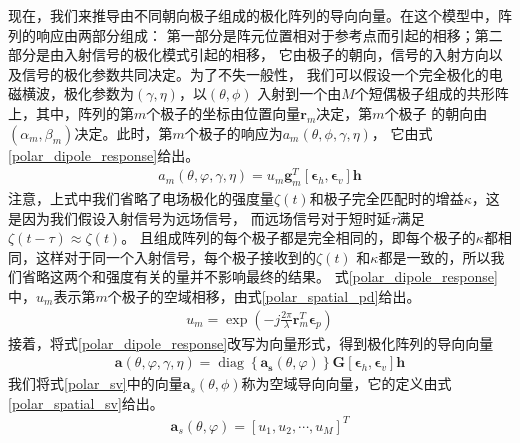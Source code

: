 \documentclass[master]{thesis-uestc}
\begin{document}
现在，我们来推导由不同朝向极子组成的极化阵列的导向向量。在这个模型中，阵列的响应由两部分组成：
第一部分是阵元位置相对于参考点而引起的相移；第二部分是由入射信号的极化模式引起的相移，
它由极子的朝向，信号的入射方向以及信号的极化参数共同决定。为了不失一般性，
我们可以假设一个完全极化的电磁横波，极化参数为$(\gamma,\eta)$，以$(\theta,\phi)$
入射到一个由$M$个短偶极子组成的共形阵上，其中，阵列的第$m$个极子的坐标由位置向量$\bm{r}_m$决定，第$m$个极子
的朝向由$(\alpha_m,\beta_m)$决定。此时，第$m$个极子的响应为$a_m(\theta,\phi,\gamma,\eta)$，
它由式\eqref{polar_dipole_response}给出。
\begin{equation}\label{polar_dipole_response}
    \begin{aligned}
        a_{m}(\theta, \varphi, \gamma, \eta)=
        u_{m} \bm{g}_{m}^{T}\left[\bm{\epsilon}_{h}, \bm{\epsilon}_{v}\right] \bm{h}
    \end{aligned}
\end{equation}
注意，上式中我们省略了电场极化的强度量$\zeta(t)$和极子完全匹配时的增益$\kappa$，这是因为我们假设入射信号为远场信号，
而远场信号对于短时延$\tau$满足$\zeta(t-\tau)\approx\zeta(t)$。
且组成阵列的每个极子都是完全相同的，即每个极子的$\kappa$都相同，这样对于同一个入射信号，每个极子接收到的$\zeta(t)$
和$\kappa$都是一致的，所以我们省略这两个和强度有关的量并不影响最终的结果。
式\eqref{polar_dipole_response}中，$u_m$表示第$m$个极子的空域相移，由式\eqref{polar_spatial_pd}给出。
\begin{equation}\label{polar_spatial_pd}
    \begin{aligned}
        u_{m}=\exp \left(-j \frac{2 \pi}{\lambda} \bm{r}_{m}^{T} \bm{\epsilon}_{p}\right)
    \end{aligned}
\end{equation}
接着，将式\eqref{polar_dipole_response}改写为向量形式，得到极化阵列的导向向量
\begin{equation}\label{polar_sv}
    \begin{aligned}
        \bm{a}(\theta, \varphi, \gamma, \eta)=
        \operatorname{diag}\left\{\bm{a}_{\bm{s}}(\theta, \varphi)\right\} 
        \bm{G}\left[\bm{\epsilon}_{h}, \bm{\epsilon}_{v}\right] \bm{h}
    \end{aligned}
\end{equation}
我们将式\eqref{polar_sv}中的向量$\bm{a}_s(\theta,\phi)$称为空域导向向量，它的定义由式\eqref{polar_spatial_sv}给出。
\begin{equation}\label{polar_spatial_sv}
    \begin{aligned}
        \bm{a}_{s}(\theta, \varphi)=\left[u_{1}, u_{2}, \cdots, u_{M}\right]^{T}
    \end{aligned}
\end{equation}
\end{document}
